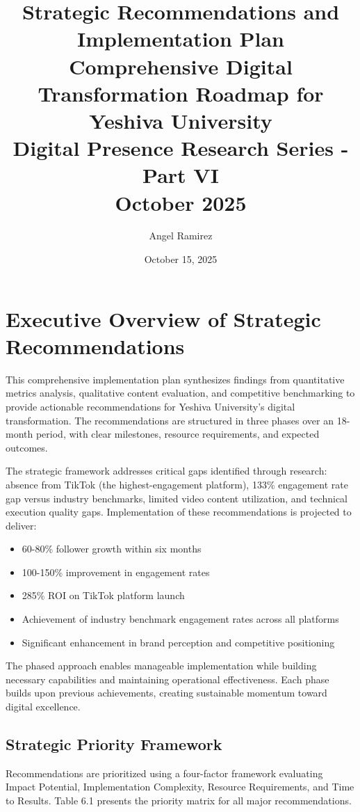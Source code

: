 \documentclass[12pt]{report}
\title{
    \Huge\textbf{Strategic Recommendations and Implementation Plan}\\[1cm]
    \Large\textbf{Comprehensive Digital Transformation Roadmap for Yeshiva University}\\[0.5cm]
    \large Digital Presence Research Series - Part VI\\[1cm]
    \normalsize October 2025
}
\author{Angel Ramirez}
\date{October 15, 2025}
\begin{document}
\maketitle

\tableofcontents

\chapter{Executive Overview of Strategic Recommendations}

This comprehensive implementation plan synthesizes findings from quantitative metrics analysis, qualitative content evaluation, and competitive benchmarking to provide actionable recommendations for Yeshiva University's digital transformation. The recommendations are structured in three phases over an 18-month period, with clear milestones, resource requirements, and expected outcomes.

The strategic framework addresses critical gaps identified through research: absence from TikTok (the highest-engagement platform), 133\% engagement rate gap versus industry benchmarks, limited video content utilization, and technical execution quality gaps. Implementation of these recommendations is projected to deliver:

\begin{itemize}
\item 60-80\% follower growth within six months
\item 100-150\% improvement in engagement rates
\item 285\% ROI on TikTok platform launch
\item Achievement of industry benchmark engagement rates across all platforms
\item Significant enhancement in brand perception and competitive positioning
\end{itemize}

The phased approach enables manageable implementation while building necessary capabilities and maintaining operational effectiveness. Each phase builds upon previous achievements, creating sustainable momentum toward digital excellence.

\section{Strategic Priority Framework}

Recommendations are prioritized using a four-factor framework evaluating Impact Potential, Implementation Complexity, Resource Requirements, and Time to Results. Table 6.1 presents the priority matrix for all major recommendations.
\end{document}
